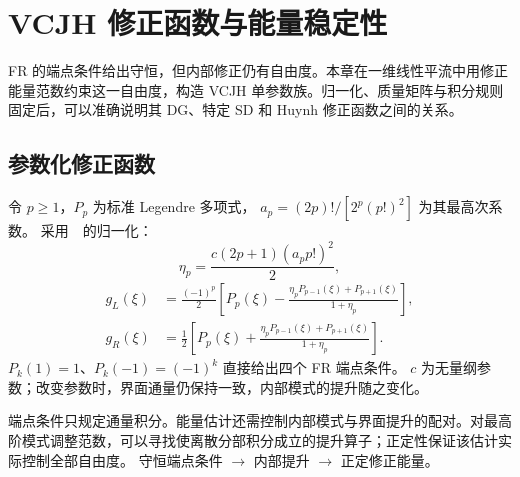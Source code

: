 \chapter{VCJH 修正函数与能量稳定性}\label{ch:12}
\begin{chaptersummary}
FR 的端点条件给出守恒，但内部修正仍有自由度。本章在一维线性平流中用修正能量范数约束这一自由度，构造 VCJH 单参数族。归一化、质量矩阵与积分规则固定后，可以准确说明其 DG、特定 SD 和 Huynh 修正函数之间的关系。
\end{chaptersummary}

\section{参数化修正函数}
令 $p\ge1$，$P_p$ 为标准 Legendre 多项式，
$a_p=(2p)!/[2^p(p!)^2]$ 为其最高次系数。
采用~\cite{vincent2011}~的归一化：
\[
\eta_p=\frac{c(2p+1)(a_pp!)^2}{2},
\]
\begin{equation}\label{eq:vcjh-functions}
\begin{aligned}
g_L(\xi)&=\frac{(-1)^p}{2}
\left[P_p(\xi)-\frac{\eta_pP_{p-1}(\xi)+P_{p+1}(\xi)}{1+\eta_p}\right],\\
g_R(\xi)&=\frac12
\left[P_p(\xi)+\frac{\eta_pP_{p-1}(\xi)+P_{p+1}(\xi)}{1+\eta_p}\right].
\end{aligned}
\end{equation}
$P_k(1)=1$、$P_k(-1)=(-1)^k$ 直接给出四个 FR 端点条件。
$c$ 为无量纲参数；改变参数时，界面通量仍保持一致，内部模式的提升随之变化。

{端点条件只规定通量积分。能量估计还需控制内部模式与界面提升的配对。对最高阶模式调整范数，可以寻找使离散分部积分成立的提升算子；正定性保证该估计实际控制全部自由度。}
{守恒端点条件 $\longrightarrow$ 内部提升 $\longrightarrow$ 正定修正能量。}

